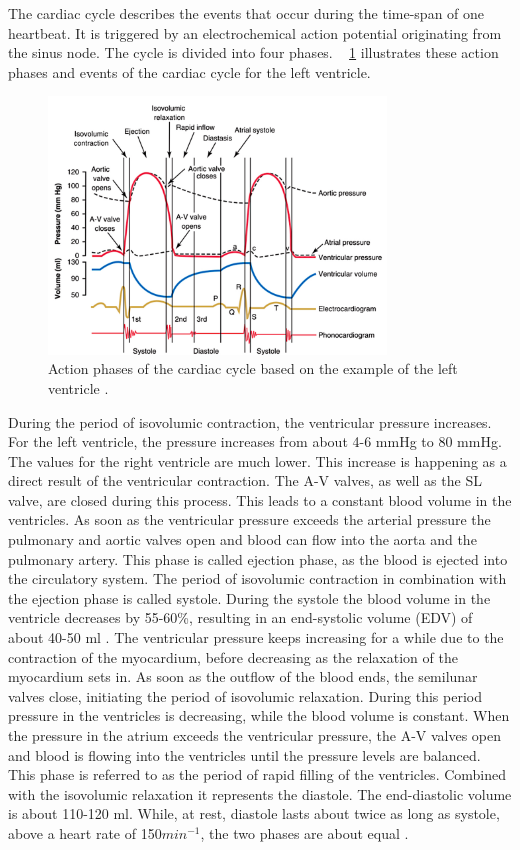 The cardiac cycle describes the events that occur during the time-span of one heartbeat. It is triggered by an electrochemical action potential originating from the sinus node. The cycle is divided into four phases. \figurename~ \ref{fig:cardiac_cycle} illustrates these action phases and events of the cardiac cycle for the left ventricle.
\begin{figure}[h]
  \centering
  \includegraphics[width=0.8\textwidth]{images/cardiac_cycle.jpg}
  \caption{Action phases of the cardiac cycle based on the example of the left ventricle \cite{GH20}.}
  \label{fig:cardiac_cycle}
\end{figure}
During the period of isovolumic contraction, the ventricular pressure increases. For the left ventricle, the pressure increases from about 4-6 mmHg to 80 mmHg. The values for the right ventricle are much lower. This increase is happening as a direct result of the ventricular contraction. The A-V valves, as well as the SL valve, are closed during this process. This leads to a constant blood volume in the ventricles. As soon as the ventricular pressure exceeds the arterial pressure the pulmonary and aortic valves open and blood can flow into the aorta and the pulmonary artery. This phase is called ejection phase, as the blood is ejected into the circulatory system. The period of isovolumic contraction in combination with the ejection phase is called systole.\cite{HKS4} During the systole the blood volume in the ventricle decreases by 55-60\%, resulting in an end-systolic volume (EDV) of about 40-50 ml \cite{GH20}. The ventricular pressure keeps increasing for a while due to the contraction of the myocardium, before decreasing as the relaxation of the myocardium sets in. As soon as the outflow of the blood ends, the semilunar valves close, initiating the period of isovolumic relaxation. During this period pressure in the ventricles is decreasing, while the blood volume is constant. When the pressure in the atrium exceeds the ventricular pressure, the A-V valves open and blood is flowing into the ventricles until the pressure levels are balanced.\cite{HKS4} This phase is referred to as the period of rapid filling of the ventricles. Combined with the isovolumic relaxation it represents the diastole. The end-diastolic volume is about 110-120 ml.\cite{GH20} While, at rest, diastole lasts about twice as long as systole, above a heart rate of 150$min^{-1}$, the two phases are about equal \cite{HKS4}.

